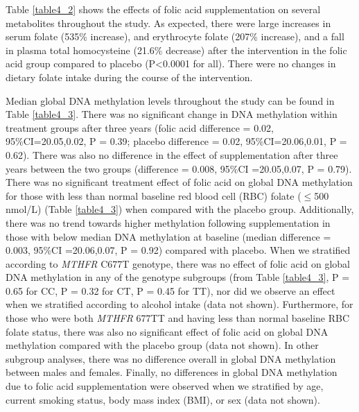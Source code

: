 \noindent Table \ref{table4_2} shows the effects of folic acid supplementation on several metabolites throughout the study. As expected, there were large increases in serum folate (535\% increase), and erythrocyte folate (207\% increase), and a fall in plasma total homocysteine (21.6\% decrease) after the intervention in the folic acid group compared to placebo (P<0.0001 for all). There were no changes in dietary folate intake during the course of the intervention.

\noindent Median global DNA methylation levels throughout the study can be found in Table \ref{table4_3}. There was no significant change in DNA methylation within treatment groups after three years (folic acid difference = 0.02, 95\%CI=20.05,0.02, P = 0.39; placebo difference = 0.02, 95\%CI=20.06,0.01, P = 0.62). There was also no difference in the effect of supplementation after three years between the two groups (difference = 0.008, 95\%CI =20.05,0.07, P = 0.79). There was no significant treatment effect of folic acid on global DNA methylation for those with less than normal baseline red blood cell (RBC) folate ($\leq$500 nmol/L) (Table \ref{table4_3}) when compared with the placebo group. Additionally, there was no trend towards higher methylation following supplementation in those with below median DNA methylation at baseline (median difference = 0.003, 95\%CI =20.06,0.07, P = 0.92) compared with placebo. When we stratified according to \emph{MTHFR} C677T genotype, there was no effect of folic acid on global DNA methylation in any of the genotype subgroups (from Table \ref{table4_3}, P = 0.65 for CC, P = 0.32 for CT, P = 0.45 for TT), nor did we observe an effect when we stratified according to alcohol intake (data not shown). Furthermore, for those who were both \emph{MTHFR} 677TT and having less than normal baseline RBC folate status, there was also no significant effect of folic acid on global DNA methylation compared with the placebo group (data not shown). In other subgroup analyses, there was no difference overall in global DNA methylation between males and females. Finally, no differences in global DNA methylation due to folic acid supplementation were observed when we stratified by age, current smoking status, body mass index (BMI), or sex (data not shown).


